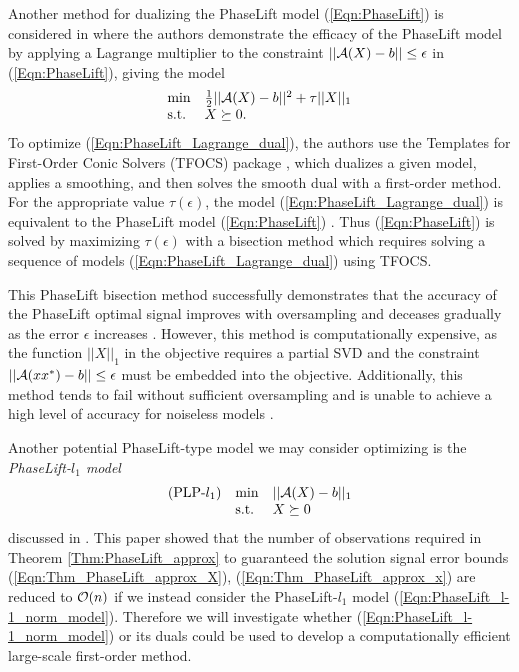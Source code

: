Another method for dualizing the PhaseLift model (\ref{Eqn:PhaseLift}) is considered in \cite{candes2013phaselift} where the authors demonstrate the efficacy of the PhaseLift model by applying a Lagrange multiplier to the constraint $||{\mathcal A}(X)-b|| \leq \epsilon$ in (\ref{Eqn:PhaseLift}), giving the model
\begin{equation}		\label{Eqn:PhaseLift_Lagrange_dual}
\begin{array}{ll}
	\min
		& \frac{1}{2}||{\mathcal A}(X) - b||^2 +\tau ||X||_1
			\\
	\textnormal{s.t.}
		&	X \succeq 0.
\end{array}
\end{equation}
To optimize (\ref{Eqn:PhaseLift_Lagrange_dual}), the authors use the Templates for First-Order Conic Solvers (TFOCS) package \cite{becker2011templates}, which dualizes a given model, applies a smoothing, and then solves the smooth dual with a first-order method.  
For the appropriate value $ \tau(\epsilon)$, the model (\ref{Eqn:PhaseLift_Lagrange_dual})  is equivalent to the PhaseLift model (\ref{Eqn:PhaseLift}) \cite[Section 28]{rockafellar1970convex}.  
Thus (\ref{Eqn:PhaseLift}) is solved by maximizing $\tau(\epsilon)$ with a bisection method which requires solving a sequence of models (\ref{Eqn:PhaseLift_Lagrange_dual}) using TFOCS.


This PhaseLift bisection method successfully demonstrates that the accuracy of the PhaseLift optimal signal improves with oversampling and deceases gradually as the error $\epsilon$ increases \cite[Section 7]{candes2013phaselift}.  However, this method is computationally expensive, as the function $||X||_1$ in the objective requires a partial SVD and the constraint $||{\mathcal A}(xx^*) - b|| \leq \epsilon$ must be embedded into the objective.  Additionally, this method tends to fail without sufficient oversampling and is unable to achieve a high level of accuracy for noiseless models \cite[Section 5, Table 1]{DBLP:journals/siamsc/FriedlanderM16}.


Another potential PhaseLift-type model we may consider optimizing is the \textit{PhaseLift-$l_1$ model}
\begin{equation} 			\label{Eqn:PhaseLift_l-1_norm_model}
\begin{array}{lll}
(\textnormal{PLP-}l_1)	
&	\min
		& ||{\mathcal A}(X) - b||_1
			\\
&	\textnormal{s.t.}
		&	X \succeq 0
\end{array}
\end{equation}
discussed in \cite{candes2014solving}.  
This paper showed that the number of observations required in Theorem \ref{Thm:PhaseLift_approx} to guaranteed the solution signal error bounds (\ref{Eqn:Thm_PhaseLift_approx_X}), (\ref{Eqn:Thm_PhaseLift_approx_x}) are reduced to ${\mathcal O}(n)$ if we instead consider the PhaseLift-$l_1$ model (\ref{Eqn:PhaseLift_l-1_norm_model}).
Therefore we will investigate whether (\ref{Eqn:PhaseLift_l-1_norm_model}) or its duals could be used to develop a computationally efficient large-scale first-order method.


